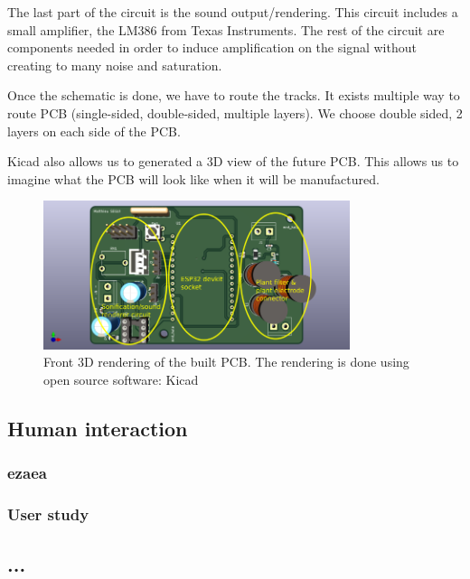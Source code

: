 The last part of the circuit is the sound output/rendering. This circuit includes a small amplifier,
the LM386 from Texas Instruments. The rest of the circuit are components needed in order to 
induce amplification on the signal without creating to many noise and saturation.



Once the schematic is done, we have to route the tracks. It exists multiple way to route PCB 
(single-sided, double-sided, multiple layers). We choose double sided, 2 layers on each side of the PCB.


Kicad also allows us to generated a 3D view of the future PCB. This allows us to imagine what the
PCB will look like when it will be manufactured.
\begin{figure}[h!]
    \centering
    \includegraphics[width=0.8\textwidth]{images/front_iop_3D_view_modified.png}
    \caption{Front 3D rendering of the built PCB. The rendering is done using open source software: Kicad} 
    \vspace{0.1cm}
    \label{fig:front_iop_3D_view_modified}
\end{figure}

\subsection{Human interaction}
\subsubsection{ezaea}
\newpage
\subsubsection{User study}

\subsection{...}